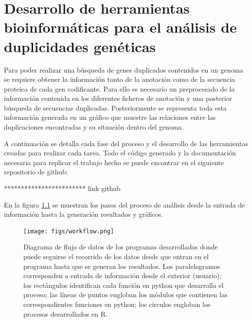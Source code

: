 \chapter{Desarrollo de herramientas bioinformáticas para el análisis de duplicidades genéticas}
\label{chapter: desarrollo}






Para poder realizar una búsqueda de genes duplicados contenidos en un genoma se requiere obtener la información tanto de la anotación como de la secuencia proteica de cada gen codificante. Para ello es necesario un preprocesado de la información contenida en los diferentes ficheros de anotación y una posterior búsqueda de secuencias duplicadas. Posteriormente se representa toda esta información generada en un gráfico que muestre las relaciones entre las duplicaciones encontradas y su situación dentro del genoma.

A continuación se detalla cada fase del proceso y el desarrollo de las herramientas creadas para realizar cada tarea. Todo el código generado y la documentación necesaria para replicar el trabajo hecho se puede encontrar en el siguiente repositorio de github:

************************ link github




En la figura \ref{fig:workflow} se muestran los pasos del proceso de análisis desde la entrada de información hasta la generación resultados y gráficos.

\begin{figure}[h]
	\centering
	\captionsetup{width=\linewidth} 
	\texttt{[image: figs/workflow.png]}
	\caption[Diagrama de flujo de datos de los programas desarrollados]{Diagrama de flujo de datos de los programas desarrollados donde puede seguirse el recorrido de los datos desde que entran en el programa hasta que se generan los resultados. Los paralelogramos corresponden a entrada de información desde el exterior (usuario); los rectángulos identifican cada función en python que desarrolla el proceso; las líneas de puntos engloban los módulos que contienen las correspondientes funciones en python; los círculos engloban los procesos desarrollados en R.}
	\label{fig:workflow}
\end{figure}

